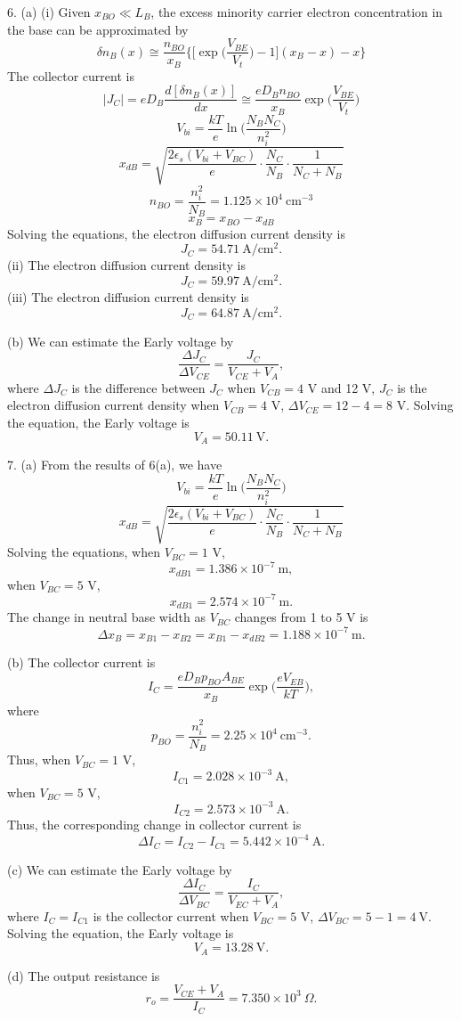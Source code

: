 \documentclass[a4paper]{article}
\begin{document}
6. (a) (i) Given $x_{BO}\ll L_B$, the excess minority carrier electron concentration in the base can be approximated by
$$\delta n_B(x)\cong\frac{n_{BO}}{x_B}\bigg\{\bigg[\exp{\bigg(\frac{V_{BE}}{V_t}\bigg)}-1\bigg](x_B-x)-x\bigg\}$$
The collector current is
$$|J_C|=eD_B\frac{d[\delta n_B(x)]}{dx}\cong\frac{eD_Bn_{BO}}{x_B}\exp{\bigg(\frac{V_{BE}}{V_t}\bigg)}$$
$$V_{bi}=\frac{kT}{e}\ln{\bigg(\frac{N_BN_C}{n_i^2}\bigg)}$$
$$x_{dB}=\sqrt{\frac{2\epsilon_s(V_{bi}+V_{BC})}{e}\cdot\frac{N_C}{N_B}\cdot\frac{1}{N_C+N_B}}$$
$$n_{BO}=\frac{n_i^2}{N_B}=1.125\times10^4\ \mathrm{cm^{-3}}$$
$$x_B=x_{BO}-x_{dB}$$
Solving the equations, the electron diffusion current density is
$$J_C=54.71\ \mathrm{A/cm^2}.$$
(ii) The electron diffusion current density is
$$J_C=59.97\ \mathrm{A/cm^2}.$$
(iii) The electron diffusion current density is
$$J_C=64.87\ \mathrm{A/cm^2}.$$

(b) We can estimate the Early voltage by
$$\frac{\Delta J_C}{\Delta V_{CE}}=\frac{J_C}{V_{CE}+V_A},$$
where $\Delta J_C$ is the difference between $J_C$ when $V_{CB}=4$ V and 12 V, $J_C$ is the electron diffusion current density when $V_{CB}=4$ V, $\Delta V_{CE}=12-4=8$ V. Solving the equation, the Early voltage is
$$V_A=50.11\ \mathrm{V}.$$

7. (a) From the results of 6(a), we have
$$V_{bi}=\frac{kT}{e}\ln{\bigg(\frac{N_BN_C}{n_i^2}\bigg)}$$
$$x_{dB}=\sqrt{\frac{2\epsilon_s(V_{bi}+V_{BC})}{e}\cdot\frac{N_C}{N_B}\cdot\frac{1}{N_C+N_B}}$$
Solving the equations, when $V_{BC}=1$ V,
$$x_{dB1}=1.386\times10^{-7}\ \mathrm{m},$$
when $V_{BC}=5$ V,
$$x_{dB1}=2.574\times10^{-7}\ \mathrm{m}.$$
The change in neutral base width as $V_{BC}$ changes from 1 to 5 V is
$$\Delta x_B=x_{B1}-x_{B2}=x_{B1}-x_{dB2}=1.188\times10^{-7}\ \mathrm{m}.$$

(b) The collector current is
$$I_C=\frac{eD_Bp_{BO}A_{BE}}{x_B}\exp{\bigg(\frac{eV_{EB}}{kT}\bigg)},$$
where
$$p_{BO}=\frac{n_i^2}{N_B}=2.25\times10^4\ \mathrm{cm^{-3}}.$$
Thus, when $V_{BC}=1$ V,
$$I_{C1}=2.028\times10^{-3}\ \mathrm{A},$$
when $V_{BC}=5$ V,
$$I_{C2}=2.573\times10^{-3}\ \mathrm{A}.$$
Thus, the corresponding change in collector current is
$$\Delta I_C=I_{C2}-I_{C1}=5.442\times10^{-4}\ \mathrm{A}.$$

(c) We can estimate the Early voltage by
$$\frac{\Delta I_C}{\Delta V_{BC}}=\frac{I_C}{V_{EC}+V_A},$$
where $I_C=I_{C1}$ is the collector current when $V_{BC}=5$ V, $\Delta V_{BC}=5-1=4\ \mathrm{V}$. Solving the equation, the Early voltage is
$$V_A=13.28\ \mathrm{V}.$$

(d) The output resistance is
$$r_o=\frac{V_{CE}+V_A}{I_C}=7.350\times10^3\ \Omega.$$
\end{document}
